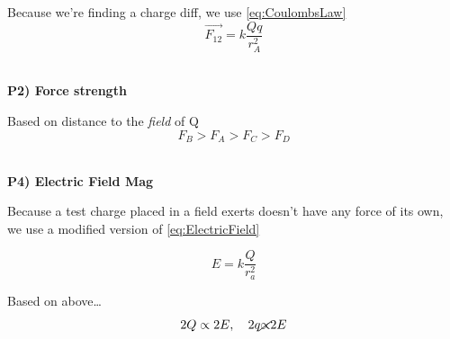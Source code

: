 \begin{example}
\begin{center}
    Because we're finding a charge diff, we use \ref{eq:CoulombsLaw}
    \[\vec{F_{12}} = k \frac{Qq}{r_A^2}\]

    \hrulefill \vspace{.5cm }\\ \textbf{P2) Force strength}

    Based on distance to the \textit{field} of Q  
    \[F_B > F_A > F_C > F_D\]

    \hrulefill \vspace{.5cm }\\ \textbf{P4) Electric Field Mag}

    Because a test charge placed in a field exerts doesn't have any force of its own, we use a modified version of \ref{eq:ElectricField}

    \[E = k \frac{Q}{r_a^2}\]

    Based on above\dots 
    \[2Q \propto 2E, \quad 2q \cancel{\propto} 2E\] 
    
\end{center}
\end{example}

\pagebreak

